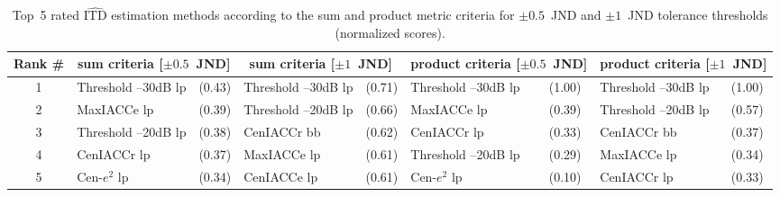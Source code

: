 \documentclass[reprint]{JASA}
\begin{document}
\onecolumngrid

\begin{table}[h]
\caption{Top~5 rated $\widehat{\textrm{ITD}}$ estimation methods
according to the sum and product metric criteria for $\pm0.5$~JND and
$\pm1$~JND tolerance thresholds (normalized scores).}

\begin{adjustbox}{width=\textwidth}
\begin{tabular}{c| l l| l l| l l| l l}
\hline\hline
Rank \#& \multicolumn{2}{c}{sum criteria [$\pm0.5$~JND]} &
\multicolumn{2}{|c}{sum criteria [$\pm1$~JND]} &
\multicolumn{2}{|c}{product criteria [$\pm0.5$~JND]} & \multicolumn{2}{|c}{product criteria [$\pm1$~JND]}\\ 
\hline
1 & Threshold --30dB {lp} & (0.43) & Threshold --30dB {lp} & (0.71) & Threshold --30dB {lp} & (1.00) & Threshold --30dB {lp} & (1.00) \\ 
2 & MaxIACCe {lp} & (0.39) & Threshold --20dB {lp} & (0.66) & MaxIACCe {lp} & (0.39) & Threshold --20dB {lp} & (0.57) \\ 
3 & Threshold --20dB {lp} & (0.38) & CenIACCr {bb} &(0.62) & CenIACCr {lp} &(0.33) & CenIACCr {bb} & (0.37) \\ 
4 & CenIACCr {lp} &(0.37) & MaxIACCe {lp} & (0.61) & Threshold --20dB {lp} & (0.29) & MaxIACCe {lp} & (0.34) \\ 
5 & Cen-$e^2$ {lp} &(0.34) & CenIACCe {lp} & (0.61) & Cen-$e^2$ {lp}
& (0.10) & CenIACCr {lp} & (0.33) \\
\hline\hline
\end{tabular}
\end{adjustbox}

\label{tab:topMethods} 
\end{table}
\twocolumngrid

\newpage
\end{document}
